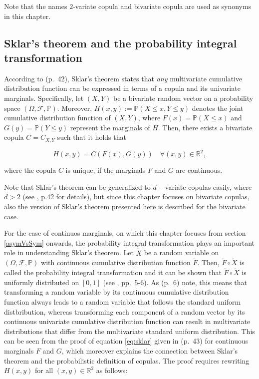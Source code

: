 \documentclass[
]{krantz}
\begin{document}
Note that the names \(2\)-variate copula and bivariate copula are used as synonyms in this chapter.

\subsection{Sklar's theorem and the probability integral transformation}\label{skl}

According to \citet{durante2016} (p.~42), Sklar's theorem states that \emph{any} multivariate cumulative distribution function can be expressed in terms of a copula and its univariate marginals. Specifically, let \((X, Y)\) be a bivariate random vector on a probability space \((\Omega, \mathcal{F}, \mathbb{P})\). Moreover, \(H(x, y) := \mathbb{P}(X \leq x, Y \leq y)\) denotes the joint cumulative distribution function of \((X, Y)\), where \(F(x) = \mathbb{P}(X \leq x)\) and \(G(y) = \mathbb{P}(Y \leq y)\) represent the marginals of \(H\). Then, there exists a bivariate copula \(C = C_{X,Y}\) such that it holds that

\begin{equation}
H(x,y) = C(F(x), G(y)) \quad \forall (x, y) \in \mathbb{R}^2,
\label{eq:sklar}
\end{equation}

where the copula \(C\) is unique, if the marginals \(F\) and \(G\) are continuous.

Note that Sklar's theorem can be generalized to \(d-\)variate copulas easily, where \(d > 2\) (see \citet{durante2016}, p.42 for details), but since this chapter focuses on bivariate copulas, also the version of Sklar's theorem presented here is described for the bivariate case.

For the case of continuos marginals, on which this chapter focuses from section \ref{asymVsSym} onwards, the probability integral transformation plays an important role in understanding Sklar's theorem. Let \(\tilde{X}\) be a random variable on \((\Omega, \mathcal{F}, \mathbb{P})\) with continuous cumulative distribution function \(\tilde{F}\). Then, \(\tilde{F} \circ \tilde{X}\) is called the probability integral transformation and it can be shown that \(\tilde{F} \circ \tilde{X}\) is uniformly distributed on \([0,1]\) (see \citet{durante2016}, pp.~5-6). As \citet{durante2016} (p.~6) note, this means that transforming a random variable by its continuous cumulative distribution function always leads to a random variable that follows the standard uniform distbribution, whereas transforming each component of a random vector by its continuous univariate cumulative distribution function can result in multivariate distributions that differ from the multivariate standard uniform distribution. This can be seen from the proof of equation \eqref{eq:sklar} given in \citet{durante2016} (p.~43) for continuous marginals \(F\) and \(G\), which moreover explains the connection between Sklar's theorem and the probabilistic definition of copulas. The proof requires rewriting \(H(x,y)\) for all \((x, y) \in \mathbb{R}^2\) as follows:
\end{document}
